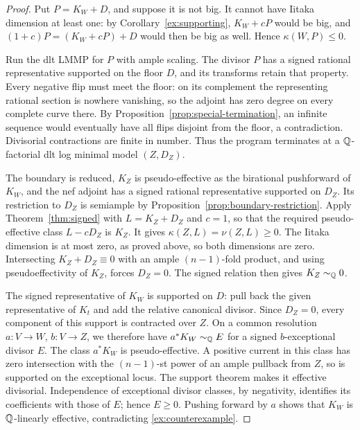 \begin{proof}
Put \(P=K_W+D\), and suppose it is not big. It cannot
have Iitaka dimension at least one: by
Corollary~\ref{ex:supporting}, \(K_W+cP\) would be big,
and
\((1+c)P=(K_W+cP)+D\) would then be big as well.
Hence \(\kappa(W,P)\leq0\).

Run the dlt LMMP for \(P\) with ample scaling.
The divisor \(P\) has a signed rational representative
supported on the floor \(D\), and its transforms retain
that property. Every negative flip must meet the floor:
on its complement the representing rational section is
nowhere vanishing, so the adjoint has zero degree on
every complete curve there. By
Proposition~\ref{prop:special-termination}, an infinite
sequence would eventually have all flips disjoint from
the floor, a contradiction. Divisorial contractions
are finite in number. Thus the program terminates at
a \(\mathbb{Q}\)-factorial dlt log minimal model
\((Z,D_Z)\).

The boundary is reduced, \(K_Z\) is pseudo-effective
as the birational pushforward of \(K_W\), and the nef
adjoint has a signed rational representative supported
on \(D_Z\). Its restriction to \(D_Z\) is semiample
by Proposition~\ref{prop:boundary-restriction}.
Apply Theorem~\ref{thm:signed} with
\(L=K_Z+D_Z\) and \(c=1\), so that the required
pseudo-effective class \(L-cD_Z\) is \(K_Z\).
It gives \(\kappa(Z,L)=\nu(Z,L)\geq0\).
The Iitaka dimension is at most zero, as proved above,
so both dimensions are zero. Intersecting
\(K_Z+D_Z\equiv0\) with an ample
\((n-1)\)-fold product, and using pseudoeffectivity of
\(K_Z\), forces \(D_Z=0\). The signed relation then
gives \(K_Z\sim_{\mathbb{Q}}0\).

The signed representative of \(K_W\) is supported on
\(D\): pull back the given representative of \(K_t\)
and add the relative canonical divisor. Since \(D_Z=0\),
every component of this support is contracted over \(Z\).
On a common resolution \(a:V\to W\), \(b:V\to Z\),
we therefore have \(a^*K_W\sim_{\mathbb{Q}} E\) for a signed
\(b\)-exceptional divisor \(E\). The class \(a^*K_W\)
is pseudo-effective. A positive current in this class has
zero intersection with the \((n-1)\)-st power of an ample
pullback from \(Z\), so is supported on the exceptional
locus. The support theorem makes it effective divisorial.
Independence of exceptional divisor classes, by negativity,
identifies its coefficients with those of \(E\); hence
\(E\geq0\). Pushing forward by \(a\) shows that
\(K_W\) is \(\mathbb{Q}\)-linearly effective,
contradicting \eqref{ex:counterexample}.
\end{proof}

